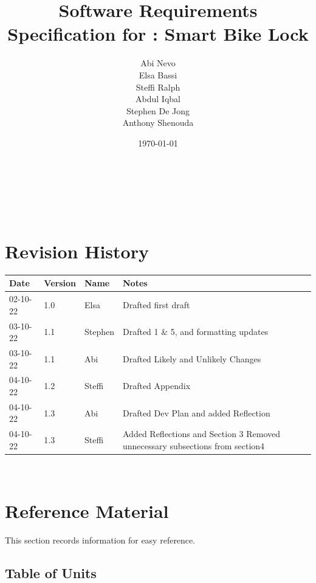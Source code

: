 \documentclass[12pt]{article}
\begin{document}
\title{Software Requirements Specification for \progname: Smart Bike Lock} 
\author{Abi Nevo\\Elsa Bassi\\Steffi Ralph\\Abdul Iqbal\\Stephen De Jong\\Anthony Shenouda}
\date{\today}
	
\maketitle

~\newpage


\tableofcontents

~\newpage

\section*{Revision History}

\begin{tabularx}{\textwidth}{p{2cm}p{2cm}p{2cm}X}
\toprule {\bf Date} & {\bf Version} & {\bf Name} & {\bf Notes}\\
\midrule
02-10-22 & 1.0 & Elsa & Drafted first draft\\
03-10-22& 1.1 & Stephen & Drafted 1 \& 5, and formatting updates\\
03-10-22 & 1.1 & Abi & Drafted Likely and Unlikely Changes\\
04-10-22& 1.2 & Steffi & Drafted Appendix\\
04-10-22 & 1.3 & Abi & Drafted Dev Plan and added Reflection\\
04-10-22 & 1.3 & Steffi & Added Reflections and Section 3 Removed unnecessary subsections from section4\\
\bottomrule
\end{tabularx}

~\newpage

\section{Reference Material}

This section records information for easy reference.

\subsection{Table of Units}
\end{document}

